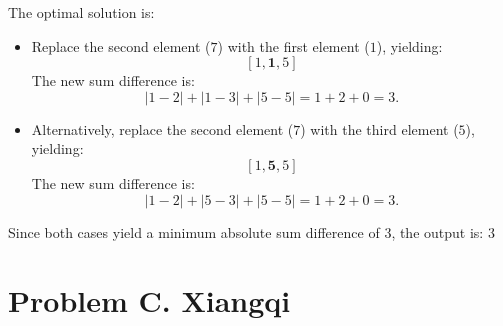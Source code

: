 \documentclass[12pt,a4paper]{article}
\begin{document}
\noindent The optimal solution is:
\begin{itemize}
    \item Replace the second element ($7$) with the first element ($1$), yielding:
    \[
    [1, \mathbf{1}, 5]
    \]
    The new sum difference is:
    \[
    \left| 1 - 2 \right| + \left| 1 - 3 \right| + \left| 5 - 5 \right| = 1 + 2 + 0 = 3.
    \]
    
    \item Alternatively, replace the second element ($7$) with the third element ($5$), yielding:
    \[
    [1, \mathbf{5}, 5]
    \]
    The new sum difference is:
    \[
    \left| 1 - 2 \right| + \left| 5 - 3 \right| + \left| 5 - 5 \right| = 1 + 2 + 0 = 3.
    \]
\end{itemize}

\noindent Since both cases yield a minimum absolute sum difference of \( 3 \), the output is: $3$
\newpage

\section*{\fontsize{18}{12}Problem C. Xiangqi }
\end{document}
